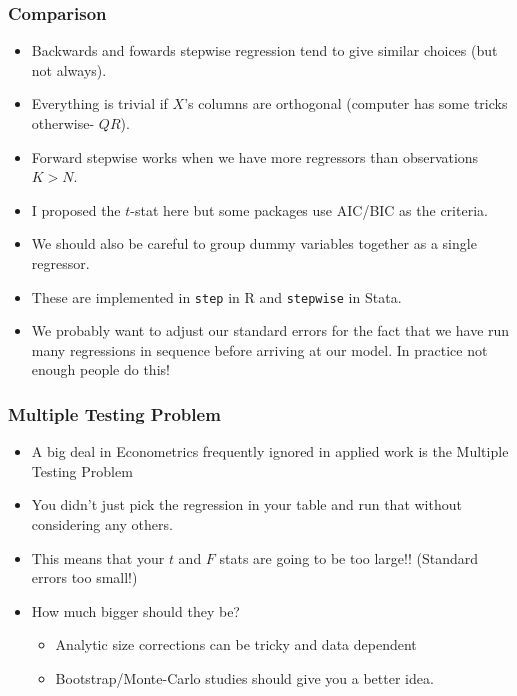 \documentclass[xcolor=pdftex,dvipsnames,table,mathserif]{beamer}
\begin{document}
\begin{frame}
\frametitle{Comparison}
\begin{itemize}
\item Backwards and fowards stepwise regression tend to give similar choices (but not always).
\item Everything is trivial if $X$'s columns are orthogonal (computer has some tricks otherwise- $QR$).
\item Forward stepwise works when we have more regressors than observations $K > N$.
\item I proposed the $t$-stat here but some packages use AIC/BIC as the criteria.
\item We should also be careful to \alert{group dummy variables together} as a single regressor.
\item These are implemented in \texttt{step} in R and \texttt{stepwise} in Stata.
\item We probably want to adjust our standard errors for the fact that we have run many regressions in sequence before arriving at our model. \alert{In practice not enough people do this!}
\end{itemize}
\end{frame}

\begin{frame}
\frametitle{Multiple Testing Problem}
\begin{itemize}
\item A big deal in Econometrics frequently ignored in applied work is the \alert{Multiple Testing Problem}
\item You didn't just pick the regression in your table and run that without considering any others.
\item This means that your $t$ and $F$ stats are going to be too large!! (Standard errors too small!)
\item How much bigger should they be?
\begin{itemize}
\item Analytic size corrections can be tricky and data dependent
\item Bootstrap/Monte-Carlo studies should give you a better idea.
\end{itemize}
\end{itemize}
\end{frame}
\end{document}
